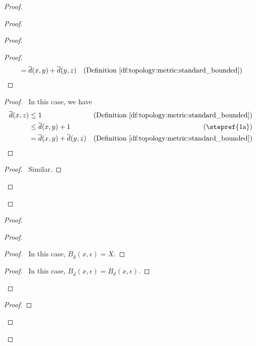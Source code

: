 \documentclass{book}
\theoremstyle{definition}
\begin{document}
\begin{proof}
\begin{proof}
\begin{proof}
\begin{proof}
\begin{align*}
            & = \overline{d}(x, y) + \overline{d}(y, z) & (\text{Definition 
              \ref{df:topology:metric:standard_bounded}})
          \end{align*}
        \end{proof}
        \begin{proof}
          \pf\ In this case, we have
          \begin{align*}
            \overline{d}(x, z) & \leq 1 & (\text{Definition 
              \ref{df:topology:metric:standard_bounded}}) \\
            & \leq \overline{d}(x, y) + 1 & (\text{\stepref{1a}}) \\
            & = \overline{d}(x, y) + \overline{d}(y, z) & (\text{Definition 
              \ref{df:topology:metric:standard_bounded}})
          \end{align*}
        \end{proof}
        \begin{proof}
          \pf\ Similar.
        \end{proof}
      \end{proof}
    \end{proof}
    \begin{proof}
      \begin{proof}
        \begin{proof}
          \pf\ In this case, $B_{\overline{d}}(x, \epsilon) = X$.
        \end{proof}
        \begin{proof}
          \pf\ In this case, $B_{\overline{d}}(x, \epsilon) = B_d(x, \epsilon)$.
        \end{proof}
      \end{proof}
      \begin{proof}
      \end{proof}
    \end{proof}
  \end{proof}
  
\end{document}
